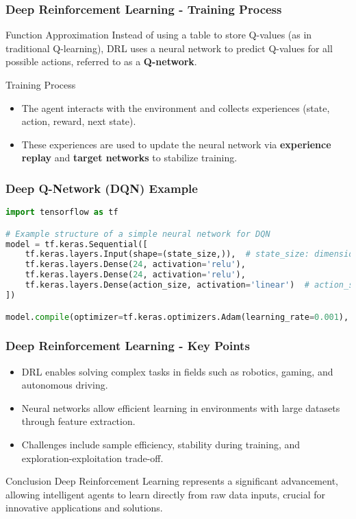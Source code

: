 \documentclass[aspectratio=169]{beamer}
\begin{document}
\begin{frame}[fragile]
    \frametitle{Deep Reinforcement Learning - Training Process}
    \begin{block}{Function Approximation}
    Instead of using a table to store Q-values (as in traditional Q-learning), DRL uses a neural network to predict Q-values for all possible actions, referred to as a \textbf{Q-network}.
    \end{block}

    \begin{block}{Training Process}
    \begin{itemize}
        \item The agent interacts with the environment and collects experiences (state, action, reward, next state).
        \item These experiences are used to update the neural network via \textbf{experience replay} and \textbf{target networks} to stabilize training.
    \end{itemize}
    \end{block}
\end{frame}

\begin{frame}[fragile]
    \frametitle{Deep Q-Network (DQN) Example}
    \begin{lstlisting}[language=Python]
import tensorflow as tf

# Example structure of a simple neural network for DQN
model = tf.keras.Sequential([
    tf.keras.layers.Input(shape=(state_size,)),  # state_size: dimension of the input state
    tf.keras.layers.Dense(24, activation='relu'),
    tf.keras.layers.Dense(24, activation='relu'),
    tf.keras.layers.Dense(action_size, activation='linear')  # action_size: number of possible actions
])

model.compile(optimizer=tf.keras.optimizers.Adam(learning_rate=0.001), loss='mean_squared_error')
    \end{lstlisting}
\end{frame}

\begin{frame}[fragile]
    \frametitle{Deep Reinforcement Learning - Key Points}
    \begin{itemize}
        \item DRL enables solving complex tasks in fields such as robotics, gaming, and autonomous driving.
        \item Neural networks allow efficient learning in environments with large datasets through feature extraction.
        \item Challenges include sample efficiency, stability during training, and exploration-exploitation trade-off.
    \end{itemize}

    \begin{block}{Conclusion}
    Deep Reinforcement Learning represents a significant advancement, allowing intelligent agents to learn directly from raw data inputs, crucial for innovative applications and solutions.
    \end{block}
\end{frame}
\end{document}
